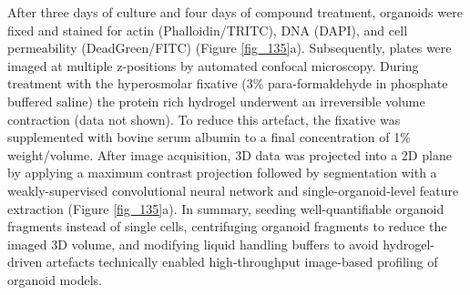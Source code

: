 \begin{flushleft}
\bigbreak

After three days of culture and four days of compound treatment, organoids were fixed and stained for actin (Phalloidin/TRITC), DNA (DAPI), and cell permeability (DeadGreen/FITC) (Figure \ref{fig_135}a). Subsequently, plates were imaged at multiple z-positions by automated confocal microscopy. During treatment with the hyperosmolar fixative (3\% para-formaldehyde in phosphate buffered saline) the protein rich hydrogel underwent an irreversible volume contraction (data not shown). To reduce this artefact, the fixative was supplemented with bovine serum albumin to a final concentration of 1\% weight/volume. After image acquisition, 3D data was projected into a 2D plane by applying a maximum contrast projection followed by segmentation with a weakly-supervised convolutional neural network and single-organoid-level feature extraction (Figure \ref{fig_135}a). In summary, seeding well-quantifiable organoid fragments instead of single cells, centrifuging organoid fragments to reduce the imaged 3D volume, and modifying liquid handling buffers to avoid hydrogel-driven artefacts technically enabled high-throughput image-based profiling of organoid models. 

\end{flushleft}
